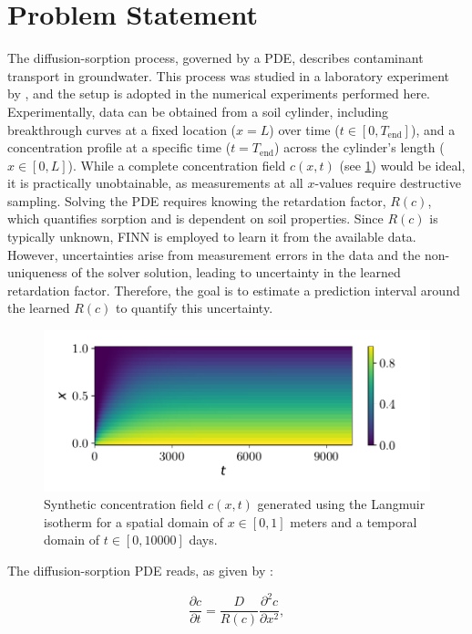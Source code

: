 \section{Problem Statement}
The diffusion-sorption process, governed by a PDE, describes contaminant transport in groundwater. This process was studied in a laboratory experiment by \textcite{nowak2016entropy}, and the setup is adopted in the numerical experiments performed here. Experimentally, data can be obtained from a soil cylinder, including breakthrough curves at a fixed location ($x=L$) over time ($t \in [0, T_{\text{end}}]$), and a concentration profile at a specific time ($t=T_{\text{end}}$) across the cylinder's length ($x \in [0,L]$). While a complete concentration field $c(x,t)$ (see \cref{fig:c_diss_field_full}) would be ideal, it is practically unobtainable, as measurements at all $x$-values require destructive sampling. Solving the PDE requires knowing the retardation factor, $R(c)$, which quantifies sorption and is dependent on soil properties. Since $R(c)$ is typically unknown, FINN is employed to learn it from the available data. However, uncertainties arise from measurement errors in the data and the non-uniqueness of the solver solution, leading to uncertainty in the learned retardation factor. Therefore, the goal is to estimate a prediction interval around the learned $R(c)$ to quantify this uncertainty.

\begin{figure}[h]
    \centering
    \includegraphics{figs/c_diss_field_full.pdf}
    \caption{Synthetic concentration field $c(x,t)$ generated using the Langmuir isotherm for a spatial domain of $x \in [0, 1]$ meters and a temporal domain of $t \in [0, 10000]$ days.}
    \label{fig:c_diss_field_full}
\end{figure}


The diffusion-sorption PDE reads, as given by \textcite{nowak2016entropy}:

\begin{equation}
    \frac{\partial c}{\partial t} = \frac{D}{R(c)} \frac{\partial^2 c}{\partial x^2},
    \label{eq:diff-sorpt-pde}
\end{equation}

